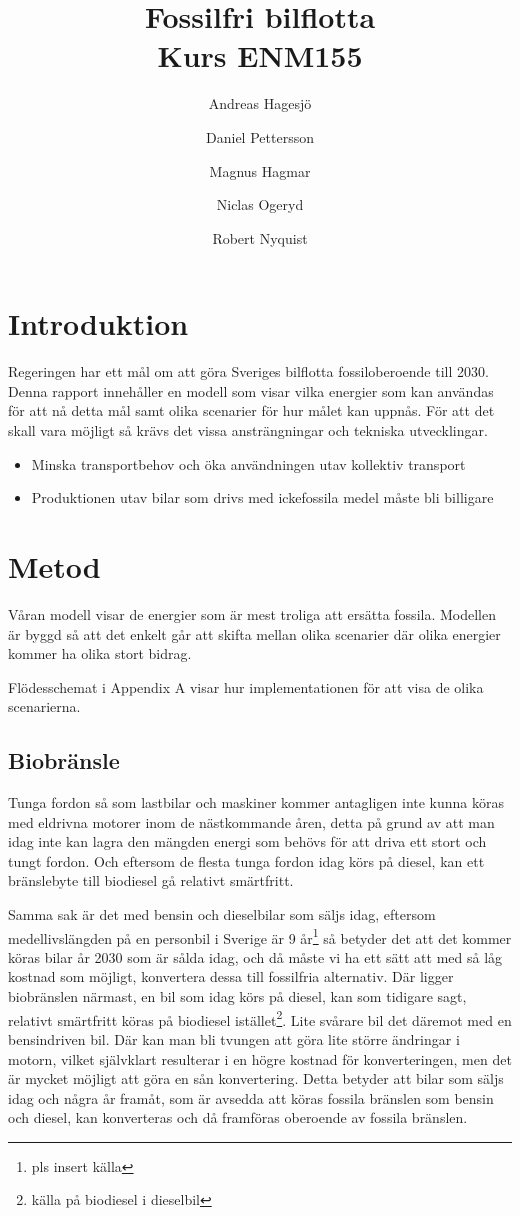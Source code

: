 \documentclass[a4paper,11pt,fleqn, titlepage]{article}
\author{Andreas Hagesjö \and Daniel Pettersson \and
Magnus Hagmar \and Niclas Ogeryd \and Robert Nyquist}
\title{Fossilfri bilflotta \\ Kurs ENM155}
\begin{document}
\maketitle

\section{Introduktion}
Regeringen har ett mål om att göra Sveriges bilflotta fossiloberoende till 2030. Denna rapport innehåller en modell som visar vilka energier som kan användas för att nå detta mål samt olika scenarier för hur målet kan uppnås.
För att det skall vara möjligt så krävs det vissa ansträngningar och tekniska utvecklingar.


\begin{itemize}
  \item Minska transportbehov och öka användningen utav kollektiv transport 
  \item Produktionen utav bilar som drivs med ickefossila medel måste bli billigare
 
\end{itemize}

\section{Metod}

Våran modell visar de energier som är mest troliga att ersätta fossila. Modellen är byggd så att det enkelt går att skifta mellan olika scenarier där olika energier kommer ha olika stort bidrag.


Flödesschemat i Appendix A visar hur implementationen för att visa de olika scenarierna.

\subsection{Biobränsle}
Tunga fordon så som lastbilar och maskiner kommer antagligen inte kunna
köras med eldrivna motorer inom de nästkommande åren, detta på grund av att
man idag inte kan lagra den mängden energi som behövs för att driva ett
stort och tungt fordon. Och eftersom de flesta tunga fordon idag körs på
diesel, kan ett bränslebyte till biodiesel gå relativt smärtfritt.

Samma sak är det med bensin och dieselbilar som säljs idag, eftersom
medellivslängden på en personbil i Sverige är 9 år\footnote{pls insert
källa} så betyder det att det kommer köras bilar år 2030 som är sålda idag,
och då måste vi ha ett sätt att med så låg kostnad som möjligt, konvertera
dessa till fossilfria alternativ. Där ligger biobränslen närmast, en bil
som idag körs på diesel, kan som tidigare sagt, relativt smärtfritt köras
på biodiesel istället\footnote{källa på biodiesel i dieselbil}. Lite
svårare bil det däremot med en bensindriven bil. Där kan man bli tvungen
att göra lite större ändringar i motorn, vilket självklart resulterar i en
högre kostnad för konverteringen, men det är mycket möjligt att göra en sån
konvertering. Detta betyder att bilar som säljs idag och några år framåt,
som är avsedda att köras fossila bränslen som bensin och diesel, kan
konverteras och då framföras oberoende av fossila bränslen.
\end{document}
